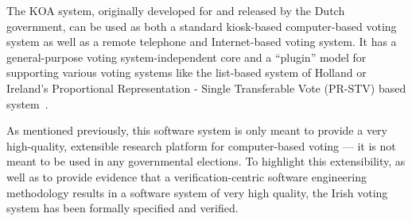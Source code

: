 \documentclass[letterpaper,twocolumn,10pt]{article}
\begin{document}
The KOA system, originally developed for and released by the Dutch government, 
can be used as both a standard
kiosk-based computer-based voting system as well as a remote telephone and
Internet-based voting system.  It has a general-purpose voting
system-independent core and a ``plugin'' model for supporting various
voting systems like the list-based system of Holland or Ireland's
Proportional Representation - Single Transferable Vote (PR-STV) based
system~\cite{KiniryEtAl06}.

As mentioned previously, this software system is only meant to provide
a very high-quality, extensible research platform for computer-based
voting --- it is not meant to be used in any governmental elections.  To
highlight this extensibility, as well as to provide evidence that a
verification-centric software engineering methodology results in a
software system of very high quality, the Irish voting system has
been formally specified and verified.

% 
% 


\end{document}
